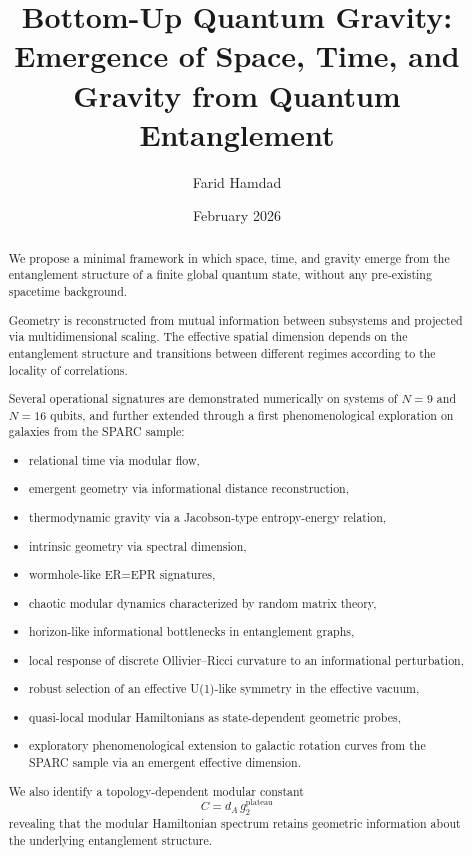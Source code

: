 \documentclass[11pt]{article}
\title{Bottom-Up Quantum Gravity:\\
Emergence of Space, Time, and Gravity from Quantum Entanglement}
\author{Farid Hamdad}
\date{February 2026}
\begin{document}
\maketitle

\begin{abstract}

We propose a minimal framework in which space, time, and gravity emerge
from the entanglement structure of a finite global quantum state,
without any pre-existing spacetime background.

Geometry is reconstructed from mutual information between subsystems
and projected via multidimensional scaling. The effective spatial
dimension depends on the entanglement structure and transitions between
different regimes according to the locality of correlations.

Several operational signatures are demonstrated numerically on systems
of $N=9$ and $N=16$ qubits, and further extended through a first
phenomenological exploration on galaxies from the SPARC sample:

\begin{itemize}
\item relational time via modular flow,
\item emergent geometry via informational distance reconstruction,
\item thermodynamic gravity via a Jacobson-type entropy-energy relation,
\item intrinsic geometry via spectral dimension,
\item wormhole-like ER=EPR signatures,
\item chaotic modular dynamics characterized by random matrix theory,
\item horizon-like informational bottlenecks in entanglement graphs,
\item local response of discrete Ollivier--Ricci curvature to an
      informational perturbation,
\item robust selection of an effective U(1)-like symmetry in the
      effective vacuum,
\item quasi-local modular Hamiltonians as state-dependent geometric probes,
\item exploratory phenomenological extension to galactic rotation curves
      from the SPARC sample via an emergent effective dimension.
\end{itemize}

We also identify a topology-dependent modular constant
\[
C = d_A\, g_2^{\mathrm{plateau}}
\]
revealing that the modular Hamiltonian spectrum retains geometric
information about the underlying entanglement structure.


\end{abstract}
\end{document}

